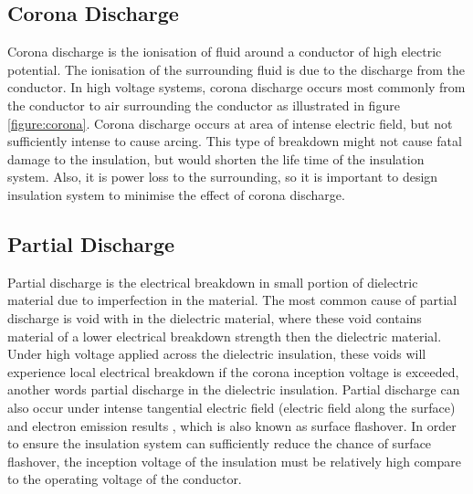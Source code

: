 \subsection{Corona Discharge}
Corona discharge is the ionisation of fluid around a conductor of high electric potential. The ionisation of the surrounding fluid is due to the discharge from the conductor. In high voltage systems, corona discharge occurs most commonly from the conductor to air surrounding the conductor as illustrated in figure \ref{figure:corona}. Corona discharge occurs at area of intense electric field, but not sufficiently intense to cause arcing. This type of breakdown might not cause fatal damage to the insulation, but would shorten the life time of the insulation system. Also, it is power loss to the surrounding, so it is important to design insulation system to minimise the effect of corona discharge.

\subsection{Partial Discharge}
Partial discharge is the electrical breakdown in small portion of dielectric material due to imperfection in the material. The most common cause of partial discharge is void with in the dielectric material, where these void contains material of a lower electrical breakdown strength then the dielectric material. Under high voltage applied across the dielectric insulation, these voids will experience local electrical breakdown if the corona inception voltage is exceeded, another words partial discharge in the dielectric insulation. Partial discharge can also occur under intense tangential electric field (electric field along the surface) and electron emission results \cite{surfaceflashover}, which is also known as surface flashover. In order to ensure the insulation system can sufficiently reduce the chance of surface flashover, the inception voltage of the insulation must be relatively high compare to the operating voltage of the conductor.
